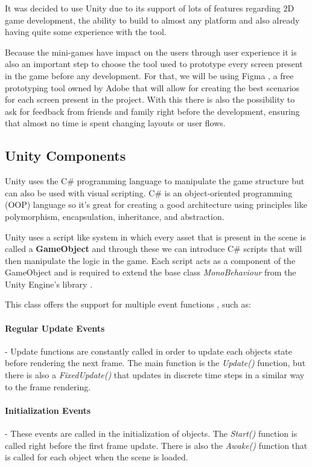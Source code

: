 It was decided to use Unity due to its support of lots of features regarding 2D game development, the ability to build to almost any platform and also already having quite some experience with the tool.

Because the mini-games have impact on the users through user experience it is also an important step to choose the tool used to prototype every screen present in the game before any development. For that, we will be using Figma \cite{figma}, a free prototyping tool owned by Adobe that will allow for creating the best scenarios for each screen present in the project. With this there is also the possibility to ask for feedback from friends and family right before the development, ensuring that almost no time is spent changing layouts or user flows.

\newpage
\subsection{Unity Components}
Unity uses the C\# programming language to manipulate the game structure but can also be used with visual scripting. C\# is an object-oriented programming (OOP) language so it's great for creating a good architecture using principles like polymorphism, encapsulation, inheritance, and abstraction.

Unity uses a script like system in which every asset that is present in the scene is called a \textbf{GameObject} and through these we can introduce C\# scripts that will then manipulate the logic in the game. Each script acts as a component of the GameObject and is required to extend the base class \textit{MonoBehaviour} from the Unity Engine's library \cite{unityDocMonoBehaviour}.

This class offers the support for multiple event functions \cite{unityDocEvent}, such as:

\paragraph{Regular Update Events} - Update functions are constantly called in order to update each objects state before rendering the next frame. The main function is the \textit{Update()} function, but there is also a \textit{FixedUpdate()} that updates in discrete time steps in a similar way to the frame rendering.

\paragraph{Initialization Events} - These events are called in the initialization of objects. The \textit{Start()} function is called right before the first frame update. There is also the \textit{Awake()} function that is called for each object when the scene is loaded. 

